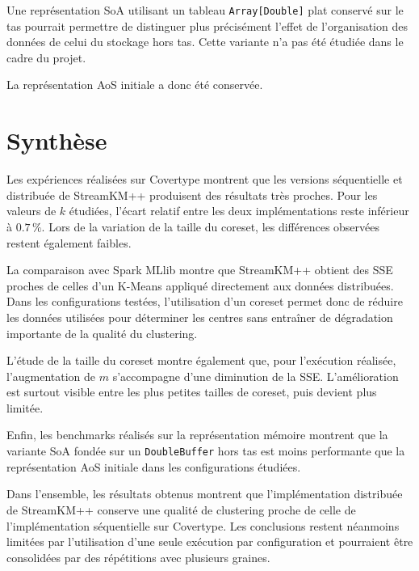 Une représentation SoA utilisant un tableau \texttt{Array[Double]} plat conservé sur le tas pourrait permettre de distinguer plus précisément l'effet de l'organisation des données de celui du stockage hors tas. Cette variante n'a pas été étudiée dans le cadre du projet.

La représentation AoS initiale a donc été conservée.

\section{Synthèse}
\label{sec:eval-synthese}

Les expériences réalisées sur Covertype montrent que les versions séquentielle et distribuée de StreamKM++ produisent des résultats très proches. Pour les valeurs de \(k\) étudiées, l'écart relatif entre les deux implémentations reste inférieur à \(0.7\,\%\). Lors de la variation de la taille du coreset, les différences observées restent également faibles.

La comparaison avec Spark MLlib montre que StreamKM++ obtient des SSE proches de celles d'un K-Means appliqué directement aux données distribuées. Dans les configurations testées, l'utilisation d'un coreset permet donc de réduire les données utilisées pour déterminer les centres sans entraîner de dégradation importante de la qualité du clustering.

L'étude de la taille du coreset montre également que, pour l'exécution réalisée, l'augmentation de \(m\) s'accompagne d'une diminution de la SSE. L'amélioration est surtout visible entre les plus petites tailles de coreset, puis devient plus limitée.

Enfin, les benchmarks réalisés sur la représentation mémoire montrent que la variante SoA fondée sur un \texttt{DoubleBuffer} hors tas est moins performante que la représentation AoS initiale dans les configurations étudiées.

Dans l'ensemble, les résultats obtenus montrent que l'implémentation distribuée de StreamKM++ conserve une qualité de clustering proche de celle de l'implémentation séquentielle sur Covertype. Les conclusions restent néanmoins limitées par l'utilisation d'une seule exécution par configuration et pourraient être consolidées par des répétitions avec plusieurs graines.
